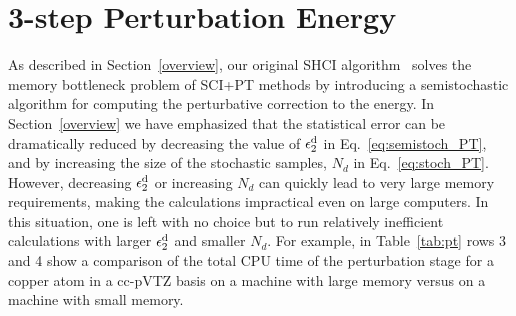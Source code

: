 \documentclass[%
reprint,
 superscriptaddress,
 amsmath,amssymb,
 aps,
]{revtex4-1}
\begin{document}
\section{3-step Perturbation Energy}
\label{multi}

As described in Section~\ref{overview}, our original SHCI algorithm~\cite{ShaHolJeaAlaUmr-JCTC-17} solves the memory bottleneck problem of SCI+PT methods
by introducing a semistochastic algorithm for computing the perturbative correction to the energy.
In Section~\ref{overview} we have emphasized that the
statistical error can be dramatically reduced
by decreasing the value of $\epsilon_2^{\rm d}$ in Eq.~\ref{eq:semistoch_PT}, and by increasing the size of the stochastic samples, $N_d$ in Eq.~\ref{eq:stoch_PT}.
However, decreasing $\epsilon_2^{\rm d}$ or increasing $N_d$ can quickly lead to very large memory requirements,
making the calculations impractical even on large computers. In this situation, one is left with no choice but to run relatively
inefficient calculations with larger $\epsilon_2^{\rm d}$ and smaller $N_d$.
For example, in Table~\ref{tab:pt} rows 3 and 4 show a comparison of the total CPU time of the perturbation stage
for a copper atom in a cc-pVTZ basis on a machine with large memory versus on a machine with small memory.
\end{document}
